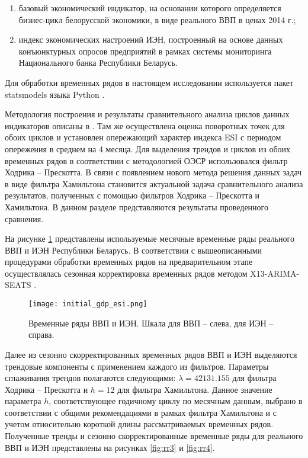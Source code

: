 \documentclass[a4paper,14pt]{extreport}
\begin{document}
	\begin{enumerate}
		\item базовый экономический индикатор, на основании которого определяется бизнес-цикл белорусской экономики, в виде реального ВВП в ценах 2014 г.;
		\item индекс экономических настроений ИЭН, построенный на основе данных конъюнктурных опросов предприятий в рамках системы мониторинга Национального банка Республики Беларусь.
	\end{enumerate}

	Для обработки временных рядов в настоящем исследовании используется пакет statsmodels языка Python \cite{statsmodels}.
	
	Методология построения и результаты сравнительного анализа циклов данных индикаторов описаны в \cite{esiMakingAlt}. Там же осуществлена оценка поворотных точек для обоих циклов и установлен опережающий характер индекса ESI с периодом опережения в среднем на 4 месяца. Для выделения трендов и циклов из обоих временных рядов в соответствии с методологией ОЭСР \cite{schuler_detrend} использовался фильтр Ходрика -- Прескотта. В связи с появлением нового метода решения данных задач в виде фильтра Хамильтона становится актуальной задача сравнительного анализа результатов, полученных с помощью фильтров Ходрика -- Прескотта и Хамильтона. В данном разделе представляются результаты проведенного сравнения. 
	
	На рисунке \ref{fig:inital_gdp_esi} представлены используемые месячные временные ряды реального ВВП и ИЭН Республики Беларусь. В соответствии с вышеописанными процедурами обработки временных рядов на предварительном этапе осуществлялась сезонная корректировка временных рядов методом X13-ARIMA-SEATS \cite{seasonalManual}.
	
	
	\begin{figure}
		\texttt{[image: initial\_gdp\_esi.png]}
		\caption{
			Временные ряды ВВП и ИЭН. 
			Шкала для ВВП -- слева, для ИЭН -- справа. 
		}
		\label{fig:inital_gdp_esi}
	\end{figure} 

	Далее из сезонно скорректированных временных рядов ВВП и ИЭН выделяются трендовые компоненты с применением каждого из фильтров. Параметры сглаживания трендов полагаются следующими: $\lambda=42131.155$ для фильтра Ходрика -- Прескотта \cite{esiMakingAlt} и $h=12$ для фильтра Хамильтона. Данное значение параметра $h$, соответствующее годичному циклу по месячным данным, выбрано в соответствии с общими рекомендациями в рамках фильтра Хамильтона и с учетом относительно короткой длины рассматриваемых временных рядов. Полученные тренды и сезонно скорректированные временные ряды для реального ВВП и ИЭН представлены на рисунках \ref{fig:rr3} и \ref{fig:rr4}.
	
\end{document}
